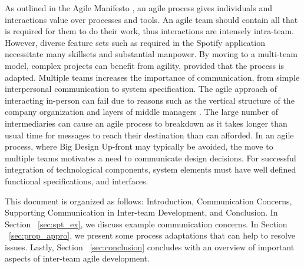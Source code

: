 As outlined in the Agile Manifesto \cite{beck2001agile}, an agile process gives individuals and interactions value over processes and tools.
An agile team should contain all that is required for them to do their work, thus interactions are intensely intra-team.
However, diverse feature sets such as required in the Spotify application necessitate many skillsets and substantial manpower.
By moving to a multi-team model, complex projects can benefit from agility, provided that the process is adapted.
Multiple teams increases the importance of communication, from simple interpersonal communication to system specification. 
The agile approach of interacting in-person can fail due to reasons such as the vertical structure of the company organization and layers of middle managers \cite{dzone_article}.
The large number of intermediaries can cause an agile process to breakdown as it takes longer than usual time for messages to reach their destination than can afforded.
In an agile process, where Big Design Up-front may typically be avoided, the move to multiple teams motivates a need to communicate design decisions.
For successful integration of technological components, system elements must have well defined functional specifications, and interfaces.


This document is organized as follows: Introduction, Communication Concerns, Supporting Communication in Inter-team Development, and Conclusion. 
In Section ~\ref{sec:spt_ex}, we discuss example communication concerns.
In Section ~\ref{sec:prop_appro}, we present some process adaptations that can help to resolve issues.
Lastly, Section ~\ref{sec:conclusion} concludes with an overview of important aspects of inter-team agile development.


